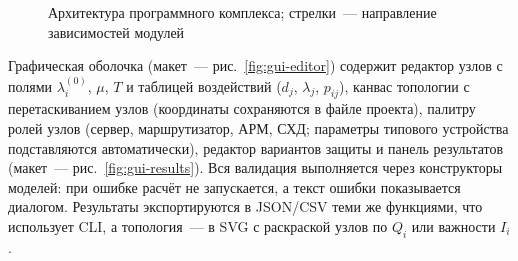 \documentclass[12pt]{article}
\begin{document}
\begin{figure}[htb]
\centering
{}
\caption{Архитектура программного комплекса; стрелки~--- направление
зависимостей модулей}
\label{fig:arch}
\end{figure}

Графическая оболочка (макет~--- рис.~\ref{fig:gui-editor}) содержит
редактор узлов с полями $\lambda_i^{(0)}$, $\mu$, $T$ и таблицей
воздействий ($d_j$, $\lambda_j$, $p_{ij}$), канвас топологии с
перетаскиванием узлов (координаты сохраняются в файле проекта), палитру
ролей узлов (сервер, маршрутизатор, АРМ, СХД; параметры типового
устройства подставляются автоматически), редактор вариантов защиты и
панель результатов (макет~--- рис.~\ref{fig:gui-results}). Вся валидация
выполняется через конструкторы моделей: при ошибке расчёт не запускается,
а текст ошибки показывается диалогом. Результаты экспортируются в JSON/CSV
теми же функциями, что использует CLI, а топология~--- в SVG с раскраской
узлов по $Q_i$ или важности $I_i$.
\end{document}
